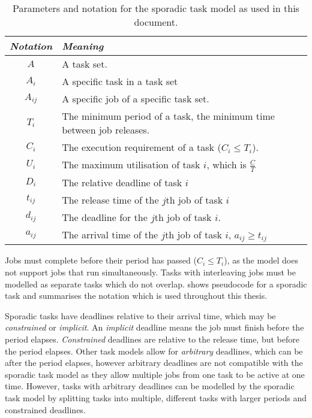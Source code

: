 \begin{table}
\centering
    \begin{tabular}{cp{}}\toprule
    \emph{Notation} & \emph{Meaning} \\\midrule
    $A$               & A task set. \\
    $A_{i}$           & A specific task in a task set \\
    $A_{ij}$          & A specific job of a specific task set. \\
    $T_{i}$           & The minimum period of a task, the minimum time between job releases. \\
    $C_{i}$           & The execution requirement of a task ($C_{i} \leq T_{i}$). \\
    $U_{i}$           & The maximum utilisation of task $i$, which is $\frac{C}{T}$ \\
    $D_{i}$           & The relative deadline of task $i$ \\
    $t_{ij}$          & The release time of the $j$th job of task $i$ \\
    $d_{ij}$          & The deadline for the $j$th job of task $i$. \\
    $a_{ij}$          & The arrival time of the $j$th job of task $i$, $a_{ij} \geq t_{ij}$ \\
    \bottomrule
    \end {tabular}
    \caption{Parameters and notation for the sporadic task model as used in this document.}
    \label{t:notation}
\end{table}

Jobs must complete before their period has passed ($C_{i} \leq T_{i}$), as the model does not
support jobs that run simultaneously. Tasks with interleaving jobs must be modelled as separate
tasks which do not overlap.   shows pseudocode for a sporadic task and
 summarises the notation which is used throughout this thesis.

Sporadic tasks have deadlines relative to their arrival time, which may be \emph{constrained} or
\emph{implicit}.  An \emph{implicit} deadline means the job must finish before the period elapses.
\emph{Constrained} deadlines are relative to the release time, but before the period elapses.  Other
task models allow for \emph{arbitrary} deadlines, which can be after the period elapses, however
arbitrary deadlines are not compatible with the sporadic task model as they allow multiple jobs from
one task to be active at one time.  However, tasks with arbitrary deadlines can be modelled by the
sporadic task model by splitting tasks into multiple, different tasks with larger periods and
constrained deadlines.


